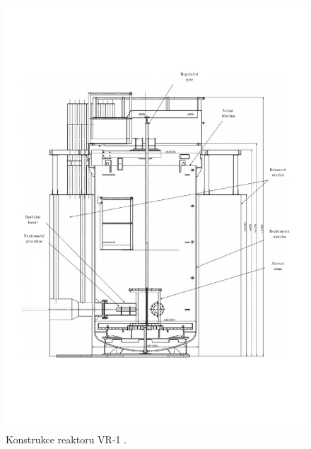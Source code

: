 \begin{figure}
	\centering
	\includegraphics[width=\textwidth, trim={1cm 5cm 1cm 4cm}, clip]{./07_prilohy/obrazky/vr_1_geometrie.pdf}
	\caption{Konstrukce reaktoru VR-1 \cite{BILY201997}.}
	\label{fig:vr_1_geometrie}
\end{figure}
